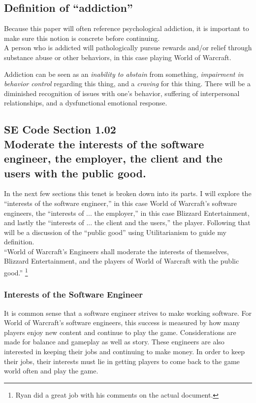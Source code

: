 \documentclass[11pt]{article}
\begin{document}
\begin{multicols}{2}
\subsection{Definition of ``addiction''}
Because this paper will often reference psychological addiction, it is important to make sure this notion is concrete before continuing.\\
A person who is addicted will pathologically pursue rewards and/or relief through substance abuse or other behaviors, in this case playing World of Warcraft. \cite{DefinitionOfAddiction}

Addiction can be seen as an \emph{inability to abstain} from something, \emph{impairment in behavior control} regarding this thing, and a \emph{craving} for this thing. There will be a diminished recognition of issues with one's behavior, suffering of interpersonal relationships, and a dysfunctional emotional response. \cite{DefinitionOfAddiction}

\subsection{SE Code Section 1.02\\Moderate the interests of the software engineer, the employer, the client and the users with the public good.}
In the next few sections this tenet is broken down into its parts. I will explore the ``interests of the software engineer,'' in this case World of Warcraft's software engineers, the ``interests of ... the employer,'' in this case Blizzard Entertainment, and lastly the ``interests of ... the client and the users,'' the player. Following that will be a discussion of the ``public good'' using Utilitarianism to guide my definition.\\
``World of Warcraft's Engineers shall moderate the interests of themselves, Blizzard Entertainment, and the players of World of Warcraft with the public good.''
\footnote{Ryan did a great job with his comments on the actual document.}
\subsubsection{Interests of the Software Engineer}
It is common sense that a software engineer strives to make working software. For World of Warcraft's software engineers, this success is measured by how many players enjoy new content and continue to play the game. Considerations are made for balance and gameplay as well as story. \cite{DevWatercooler} These engineers are also interested in keeping their jobs and continuing to make money. In order to keep their jobs, their interests must lie in getting players to come back to the game world often and play the game.

\end{multicols}
\end{document}

